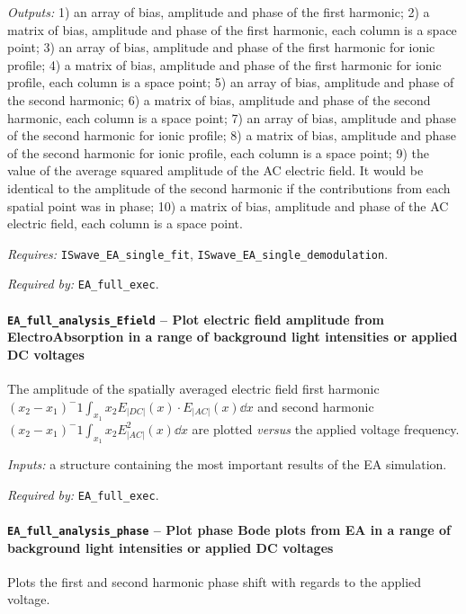		\textit{Outputs:} 1) an array of bias, amplitude and phase of the first
		harmonic;
		2) a matrix of bias, amplitude and phase of the first
		harmonic, each column is a space point;
		3) an array of bias, amplitude and phase of the first
		harmonic for ionic profile;
		4) a matrix of bias, amplitude and phase of the first
		harmonic for ionic profile, each column is a space point;
		5) an array of bias, amplitude and phase of the second
		harmonic;
		6) a matrix of bias, amplitude and phase of the second
		harmonic, each column is a space point;
		7) an array of bias, amplitude and phase of the second
		harmonic for ionic profile;
		8) a matrix of bias, amplitude and phase of the second
		harmonic for ionic profile, each column is a space point;
		9) the value of the average squared amplitude of the
		AC electric field. It would be identical to the amplitude of the
		second harmonic if the contributions from each spatial point was in
		phase;
		10) a matrix of bias, amplitude and phase of the AC electric
		field, each column is a space point.

		\textit{Requires:} \texttt{IS\-wave\_EA\_single\_fit}, \texttt{IS\-wave\_EA\_single\_demodulation}.

		\textit{Required by:} \texttt{EA\_full\_exec}.



		\paragraph{\texttt{EA\_full\_analysis\_Efield} -- Plot electric field amplitude from ElectroAbsorption in a range of background light intensities or applied DC voltages}
		The amplitude of the spatially averaged electric field first harmonic $(x_2-x_1)^-1 \int_{x_1}{x_2}E_|DC|(x) \cdot E_|AC|(x) \dd x$ and second harmonic $(x_2-x_1)^-1 \int_{x_1}{x_2} E_|AC|^2(x) \dd x$ are plotted \textsl{versus} the applied voltage frequency.

		\textit{Inputs:} a structure containing the most important results of the EA simulation.

		\textit{Required by:} \texttt{EA\_full\_exec}.


		\paragraph{\texttt{EA\_full\_analysis\_phase} -- Plot phase Bode plots from EA in a range of background light intensities or applied DC voltages}
		Plots the first and second harmonic phase shift with regards to the applied voltage.

